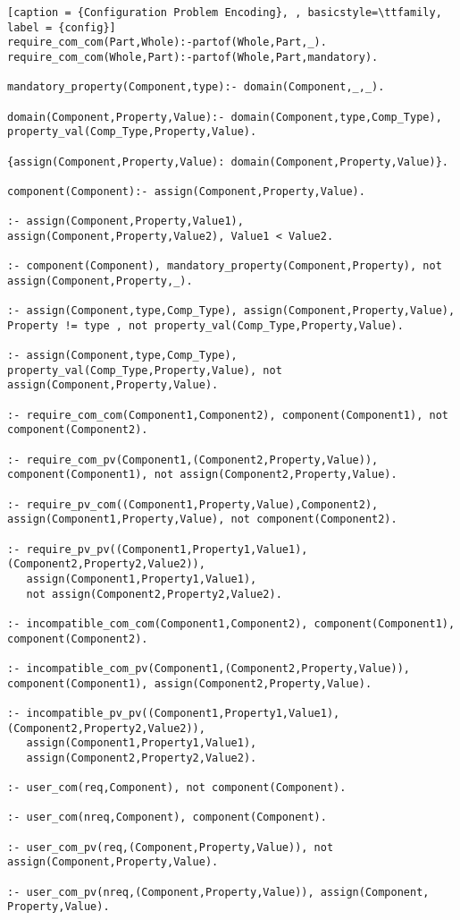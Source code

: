 \begin{lstlisting}[caption = {Configuration Problem Encoding}, , basicstyle=\ttfamily, label = {config}]
require_com_com(Part,Whole):-partof(Whole,Part,_).
require_com_com(Whole,Part):-partof(Whole,Part,mandatory).

mandatory_property(Component,type):- domain(Component,_,_).

domain(Component,Property,Value):- domain(Component,type,Comp_Type), property_val(Comp_Type,Property,Value).

{assign(Component,Property,Value): domain(Component,Property,Value)}.

component(Component):- assign(Component,Property,Value).

:- assign(Component,Property,Value1), assign(Component,Property,Value2), Value1 < Value2.

:- component(Component), mandatory_property(Component,Property), not assign(Component,Property,_).

:- assign(Component,type,Comp_Type), assign(Component,Property,Value), Property != type , not property_val(Comp_Type,Property,Value).

:- assign(Component,type,Comp_Type), property_val(Comp_Type,Property,Value), not assign(Component,Property,Value).

:- require_com_com(Component1,Component2), component(Component1), not component(Component2).

:- require_com_pv(Component1,(Component2,Property,Value)), component(Component1), not assign(Component2,Property,Value).

:- require_pv_com((Component1,Property,Value),Component2), assign(Component1,Property,Value), not component(Component2).

:- require_pv_pv((Component1,Property1,Value1), (Component2,Property2,Value2)),
   assign(Component1,Property1,Value1),
   not assign(Component2,Property2,Value2).

:- incompatible_com_com(Component1,Component2), component(Component1), component(Component2).

:- incompatible_com_pv(Component1,(Component2,Property,Value)), component(Component1), assign(Component2,Property,Value).

:- incompatible_pv_pv((Component1,Property1,Value1), (Component2,Property2,Value2)), 
   assign(Component1,Property1,Value1),
   assign(Component2,Property2,Value2).

:- user_com(req,Component), not component(Component).

:- user_com(nreq,Component), component(Component).

:- user_com_pv(req,(Component,Property,Value)), not assign(Component,Property,Value).

:- user_com_pv(nreq,(Component,Property,Value)), assign(Component, Property,Value).
\end{lstlisting}
